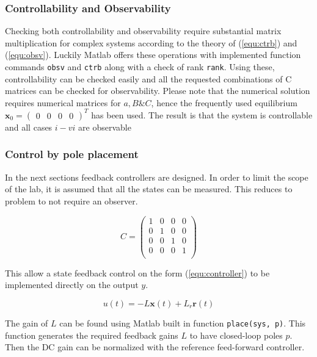\documentclass[a4paper, titlepage]{article}
\begin{document}
\subsubsection{Controllability and Observability}
Checking both controllability and observability require substantial matrix multiplication for complex systems according to the theory of (\ref{equ:ctrb}) and (\ref{equ:obsv}).
Luckily Matlab offers these operations with implemented function commands \verb|obsv| and \verb|ctrb| along with a check of rank \verb|rank|.
Using these, controllability can be checked easily and all the requested combinations of C matrices can be checked for observability.
Please note that the numerical solution requires numerical matrices for $a, B \& C$, hence the frequently used equilibrium $\textbf{x}_0 = \begin{pmatrix} 0 & 0 & 0 & 0 \end{pmatrix}^T$ has been used.
The result is that the system is controllable and all cases $i - vi$ are observable

\subsubsection{Control by pole placement}
In the next sections feedback controllers are designed.
In order to limit the scope of the lab, it is assumed that all the states can be measured.
This reduces to problem to not require an observer.

\begin{equation}
C = \begin{pmatrix}
1 & 0 & 0 & 0 \\
0 & 1 & 0 & 0 \\
0 & 0 & 1 & 0 \\
0 & 0 & 0 & 1 \\ 
\end{pmatrix}
\end{equation}

This allow a state feedback control on the form (\ref{equ:controller}) to be implemented directly on the output $y$.

\begin{equation}
u(t) = -L\textbf{x}(t) + L_r\textbf{r}(t)
\label{equ:controller}
\end{equation}

The gain of $L$ can be found using Matlab built in function \verb|place(sys, p)|.
This function generates the required feedback gains $L$ to have closed-loop poles $p$.
Then the DC gain can be normalized with the reference feed-forward controller.
\end{document}

